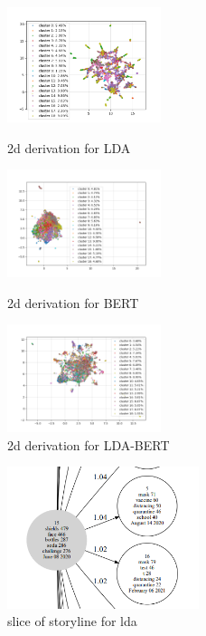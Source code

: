 \begin{figure}
\centering
{
\includegraphics[width=0.4\textwidth]{imgs/lda/2d_vis.png}
\caption{2d derivation for LDA}
\label{fig:2d_derivation for lda}
}
\hspace{10pt}    %
{
\includegraphics[width=0.4\textwidth]{imgs/bert/2d_vis.png}
\caption{2d derivation for BERT}
\label{fig:2d_derivation for bert}
}
\hspace{10pt}
{
\includegraphics[width=0.4\textwidth]{imgs/lda_bert/2d_vis.png}
\caption{2d derivation for LDA-BERT}
\label{fig:2d_derivation for lda_bert}
}
\hspace{10pt}
\end{figure}
\begin{figure}[h]
\centering
\includegraphics[width=0.5\textwidth]{imgs/lda/storyline.png}
\caption{slice of storyline for lda}
\label{fig:storyline for lda}
\end{figure}

